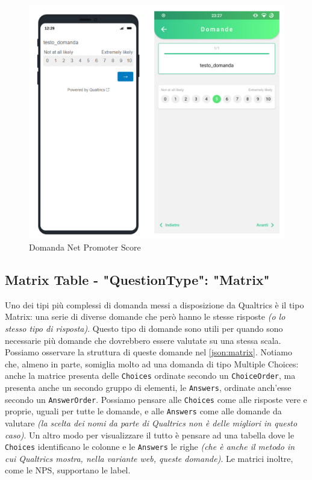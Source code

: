 \begin{figure}[ht!]
\centering
\includegraphics[width=\textwidth]{img/nps}
\caption{Domanda Net Promoter Score}
\label{fig:nps}
\end{figure}

\clearpage
\subsection{Matrix Table - "QuestionType": "Matrix"}
Uno dei tipi più complessi di domanda messi a disposizione da Qualtrics è il tipo Matrix: una serie di diverse domande che però hanno le stesse risposte \textit{(o lo stesso tipo di risposta)}. Questo tipo di domande sono utili per quando sono necessarie più domande che dovrebbero essere valutate su una stessa scala. Possiamo osservare la struttura di queste domande nel \autoref{json:matrix}. Notiamo che, almeno in parte, somiglia molto ad una domanda di tipo Multiple Choices: anche la matrice presenta delle \texttt{Choices} ordinate secondo un \texttt{ChoiceOrder}, ma presenta anche un secondo gruppo di elementi, le \texttt{Answers}, ordinate anch'esse secondo un \texttt{AnswerOrder}.
Possiamo pensare alle \texttt{Choices} come alle risposte vere e proprie, uguali per tutte le domande, e alle \texttt{Answers} come alle domande da valutare \textit{(la scelta dei nomi da parte di Qualtrics non è delle migliori in questo caso)}. Un altro modo per visualizzare il tutto è pensare ad una tabella	dove le \texttt{Choices} identificano le colonne e le \texttt{Answers} le righe \textit{(che è anche il metodo in cui Qualtrics mostra, nella variante web, queste domande)}. Le matrici inoltre, come le NPS, supportano le label.

